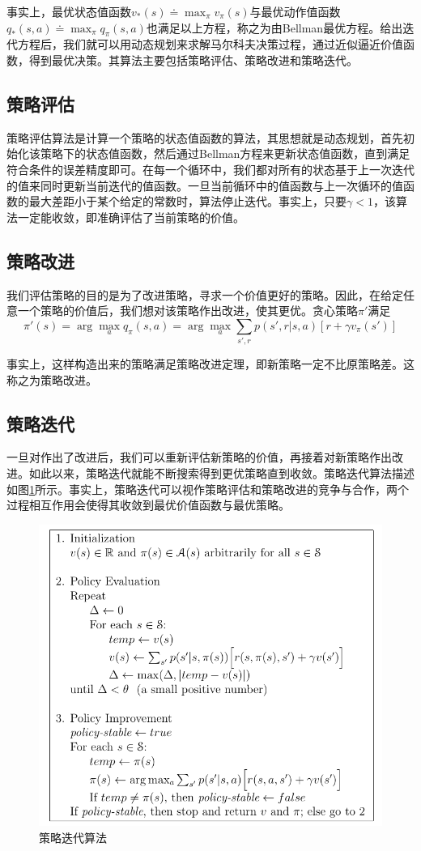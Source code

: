 \documentclass[lang=cn,11pt,a4paper,cite=number]{elegantpaper}
\begin{document}
事实上，最优状态值函数$v_*(s)\doteq\max_\pi v_\pi(s)$与最优动作值函数$q_*(s,a)\doteq \max_\pi q_\pi(s,a)$也满足以上方程，称之为由Bellman最优方程。给出迭代方程后，我们就可以用动态规划来求解马尔科夫决策过程，通过近似逼近价值函数，得到最优决策。其算法主要包括策略评估、策略改进和策略迭代\cite{rl}。
\subsection{策略评估}
策略评估算法是计算一个策略的状态值函数的算法，其思想就是动态规划，首先初始化该策略下的状态值函数，然后通过Bellman方程来更新状态值函数，直到满足符合条件的误差精度即可。在每一个循环中，我们都对所有的状态基于上一次迭代的值来同时更新当前迭代的值函数。一旦当前循环中的值函数与上一次循环的值函数的最大差距小于某个给定的常数时，算法停止迭代。事实上，只要$\gamma<1$，该算法一定能收敛，即准确评估了当前策略的价值。
\subsection{策略改进}
我们评估策略的目的是为了改进策略，寻求一个价值更好的策略。因此，在给定任意一个策略的价值后，我们想对该策略作出改进，使其更优。贪心策略$\pi'$满足$$\pi'(s)=\arg\max_a q_\pi(s,a)=\arg\max_a\sum_{s',r}p(s',r|s,a)[r+\gamma v_\pi(s')]$$

事实上，这样构造出来的策略满足策略改进定理\cite{rl}，即新策略一定不比原策略差。这称之为策略改进。
\subsection{策略迭代}
一旦对作出了改进后，我们可以重新评估新策略的价值，再接着对新策略作出改进。如此以来，策略迭代就能不断搜索得到更优策略直到收敛。策略迭代算法描述如图\ref{fig:fig3}所示。事实上，策略迭代可以视作策略评估和策略改进的竞争与合作，两个过程相互作用会使得其收敛到最优价值函数与最优策略。
\begin{figure}
	\centering
	\includegraphics[width=0.83\linewidth]{figure/fig3}
	\caption{策略迭代算法\cite{rl}}
	\label{fig:fig3}
\end{figure}
\end{document}
